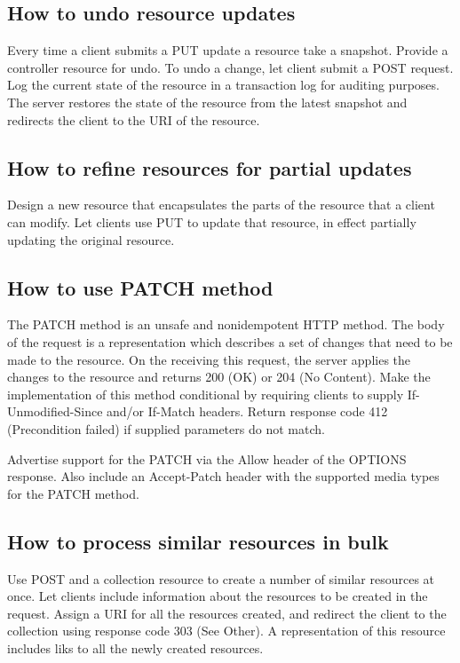 \documentclass[11pt,a4paper]{article}
\begin{document}
\subsection{How to undo resource updates}
Every time a client submits a PUT update a resource take a snapshot. Provide a controller resource for undo. To undo a change, let client submit a POST request. Log the current state of the resource in a transaction log for auditing purposes. The server restores the state of the resource from the latest snapshot and redirects the client to the URI of the resource.

\subsection{How to refine resources for partial updates}
Design a new resource that encapsulates the parts of the resource that a client can modify. Let clients use PUT to update that resource, in effect partially updating the original resource.

\subsection{How to use PATCH method}
The PATCH method is an unsafe and nonidempotent HTTP method. The body of the request is a representation which describes a set of changes that need to be made to the resource. On the receiving this request, the server applies the changes to the resource and returns 200 (OK) or 204 (No Content). Make the implementation of this method conditional by requiring clients to supply If-Unmodified-Since and/or If-Match headers. Return response code 412 (Precondition failed) if supplied parameters do not match.

Advertise support for the PATCH via the Allow header of the OPTIONS response. Also include an Accept-Patch header with the supported media types for the PATCH method.

\subsection{How to process similar resources in bulk}
Use POST and a collection resource to create a number of similar resources at once. Let clients include information about the resources to be created in the request. Assign a URI for all the resources created, and redirect the client to the collection using response code 303 (See Other). A representation of this resource includes liks to all the newly created resources.
\end{document}
